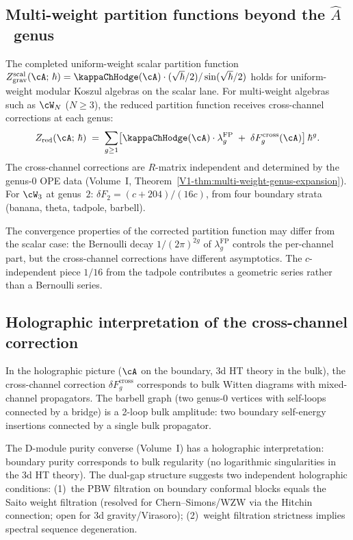 \subsection{Multi-weight partition functions beyond the
$\hat{A}$~genus}

The completed uniform-weight scalar partition function
$Z_{\mathrm{grav}}^{\mathrm{scal}}(\cA;\,\hbar)
= \kappaChHodge(\cA) \cdot (\sqrt{\hbar}/2) / \sin(\sqrt{\hbar}/2)$
holds for uniform-weight modular Koszul algebras on the scalar lane.
For multi-weight algebras such as $\cW_N$ ($N \geq 3$), the reduced
partition function
receives cross-channel corrections at each genus:
\[
Z_{\mathrm{red}}(\cA;\,\hbar)
\;=\;
\sum_{g \geq 1}
\bigl[\kappaChHodge(\cA) \cdot \lambda_g^{\mathrm{FP}}
\;+\; \delta F_g^{\mathrm{cross}}(\cA)\bigr]\,\hbar^g.
\]
The cross-channel corrections are $R$-matrix independent and
determined by the genus-$0$ OPE data
(Volume~I, Theorem~\ref{V1-thm:multi-weight-genus-expansion}).
For $\cW_3$ at genus~$2$:
$\delta F_2 = (c + 204)/(16c)$, from four boundary strata
(banana, theta, tadpole, barbell).

The convergence properties of the corrected partition function may
differ from the scalar case: the Bernoulli decay $1/(2\pi)^{2g}$
of $\lambda_g^{\mathrm{FP}}$ controls the per-channel part,
but the cross-channel corrections have different asymptotics.
The $c$-independent piece $1/16$ from the tadpole contributes
a geometric series rather than a Bernoulli series.

\subsection{Holographic interpretation of the cross-channel
correction}

In the holographic picture ($\cA$ on the boundary, 3d HT theory
in the bulk), the cross-channel correction
$\delta F_g^{\mathrm{cross}}$ corresponds to bulk Witten diagrams
with mixed-channel propagators. The barbell graph (two genus-$0$
vertices with self-loops connected by a bridge) is a 2-loop
bulk amplitude: two boundary self-energy insertions connected
by a single bulk propagator.

The D-module purity converse (Volume~I) has a holographic
interpretation: boundary purity corresponds to bulk regularity
(no logarithmic singularities in the 3d HT theory). The
dual-gap structure suggests two independent holographic conditions:
(1)~the PBW filtration on boundary conformal blocks equals the
Saito weight filtration (resolved for Chern--Simons/WZW via the
Hitchin connection; open for 3d gravity/Virasoro);
(2)~weight filtration strictness implies spectral sequence
degeneration.

